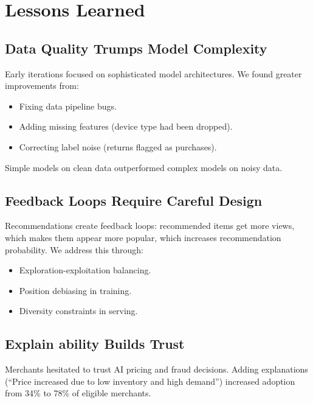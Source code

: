 \section{Lessons Learned}


\subsection{Data Quality Trumps Model Complexity}

Early iterations focused on sophisticated model architectures. We found greater improvements from:
\begin{itemize}
\item Fixing data pipeline bugs.
\item Adding missing features (device type had been dropped).
\item Correcting label noise (returns flagged as purchases).
\end{itemize}

Simple models on clean data outperformed complex models on noisy data.

\subsection{Feedback Loops Require Careful Design}

Recommendations create feedback loops: recommended items get more views, which makes them appear more popular, which increases recommendation probability. We address this through:
\begin{itemize}
\item Exploration-exploitation balancing.
\item Position debiasing in training.
\item Diversity constraints in serving.
\end{itemize}

\subsection{Explain ability Builds Trust}

Merchants hesitated to trust AI pricing and fraud decisions. Adding explanations (``Price increased due to low inventory and high demand'') increased adoption from 34\% to 78\% of eligible merchants.

